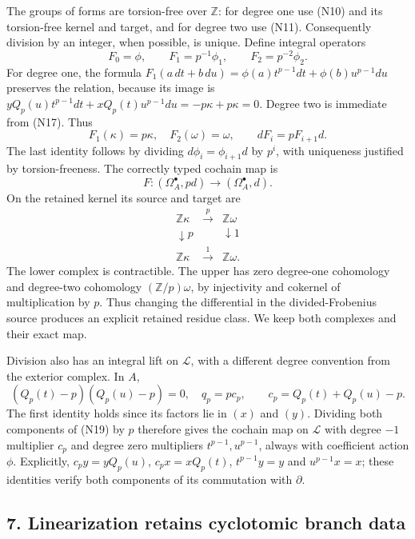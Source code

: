 \documentclass[
]{article}
\begin{document}
The groups of forms are torsion-free over \(\mathbb Z\): for degree one
use (N10) and its torsion-free kernel and target, and for degree two use
(N11). Consequently division by an integer, when possible, is unique.
Define integral operators \[
F_0=\phi,\qquad F_1=p^{-1}\phi_1,\qquad F_2=p^{-2}\phi_2.
\tag{N20}
\] For degree one, the formula
\(F_1(a\,dt+b\,du)=\phi(a)t^{p-1}dt+\phi(b)u^{p-1}du\) preserves the
relation, because its image is
\(yQ_p(u)t^{p-1}dt+xQ_p(t)u^{p-1}du=-p\kappa+p\kappa=0\). Degree two is
immediate from (N17). Thus \[
F_1(\kappa)=p\kappa,\quad F_2(\omega)=\omega,
\qquad dF_i=pF_{i+1}d.
\tag{N21}
\] The last identity follows by dividing \(d\phi_i=\phi_{i+1}d\) by
\(p^i\), with uniqueness justified by torsion-freeness. The correctly
typed cochain map is \[
F:(\Omega^\bullet_A,pd)\longrightarrow(\Omega^\bullet_A,d).
\tag{N22}
\] On the retained kernel its source and target are \[
\begin{array}{ccc}
\mathbb Z\kappa&\xrightarrow{\ p\ }&\mathbb Z\omega\\
\downarrow p&&\downarrow1\\
\mathbb Z\kappa&\xrightarrow{\ 1\ }&\mathbb Z\omega.
\end{array}
\tag{N23}
\] The lower complex is contractible. The upper has zero degree-one
cohomology and degree-two cohomology \((\mathbb Z/p)\omega\), by
injectivity and cokernel of multiplication by \(p\). Thus changing the
differential in the divided-Frobenius source produces an explicit
retained residue class. We keep both complexes and their exact map.

Division also has an integral lift on \(\mathcal L\), with a different
degree convention from the exterior complex. In \(A\), \[
(Q_p(t)-p)(Q_p(u)-p)=0,\quad
q_p=pc_p,\qquad c_p=Q_p(t)+Q_p(u)-p.
\tag{N24}
\] The first identity holds since its factors lie in \((x)\) and
\((y)\). Dividing both components of (N19) by \(p\) therefore gives the
cochain map on \(\mathcal L\) with degree \(-1\) multiplier \(c_p\) and
degree zero multipliers \(t^{p-1},u^{p-1}\), always with coefficient
action \(\phi\). Explicitly, \(c_py=yQ_p(u)\), \(c_px=xQ_p(t)\),
\(t^{p-1}y=y\) and \(u^{p-1}x=x\); these identities verify both
components of its commutation with \(\partial\).

\subsection{7. Linearization retains cyclotomic branch
data}\label{linearization-retains-cyclotomic-branch-data}
\end{document}

